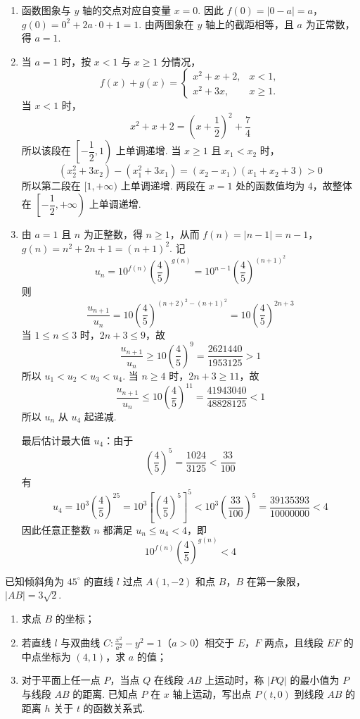 \begin{solution}
\begin{enumerate}
\item 函数图象与 \(y\) 轴的交点对应自变量 \(x=0\). 因此
\(f(0)=|0-a|=a\)，\(g(0)=0^2+2a\cdot0+1=1\).
由两图象在 \(y\) 轴上的截距相等，且 \(a\) 为正常数，得 \(a=1\).

\item 当 \(a=1\) 时，按 \(x<1\) 与 \(x\geqslant1\) 分情况，
\[
f(x)+g(x)=
\begin{cases}
x^2+x+2, & x<1,\\
x^2+3x, & x\geqslant1.
\end{cases}
\]
当 \(x<1\) 时，
\[
x^2+x+2=\left(x+\frac{1}{2}\right)^2+\frac{7}{4}
\]
所以该段在 \(\left[-\dfrac{1}{2},1\right)\) 上单调递增. 当 \(x\geqslant1\) 且 \(x_1<x_2\) 时，
\[
(x_2^2+3x_2)-(x_1^2+3x_1)=(x_2-x_1)(x_1+x_2+3)>0
\]
所以第二段在 \([1,+\infty)\) 上单调递增. 两段在 \(x=1\) 处的函数值均为 \(4\)，故整体在 \(\left[-\dfrac{1}{2},+\infty\right)\) 上单调递增.

\item 由 \(a=1\) 且 \(n\) 为正整数，得 \(n\geqslant1\)，从而
\(f(n)=|n-1|=n-1\)，\(g(n)=n^2+2n+1=(n+1)^2\).
记
\[
u_n=10^{f(n)}\left(\frac45\right)^{g(n)}
=10^{n-1}\left(\frac45\right)^{(n+1)^2}
\]
则
\[
\frac{u_{n+1}}{u_n}=10\left(\frac45\right)^{(n+2)^2-(n+1)^2}=10\left(\frac45\right)^{2n+3}
\]
当 \(1\leqslant n\leqslant3\) 时，\(2n+3\leqslant9\)，故
\[
\frac{u_{n+1}}{u_n}\geqslant10\left(\frac45\right)^9
=\frac{2621440}{1953125}>1
\]
所以 \(u_1<u_2<u_3<u_4\). 当 \(n\geqslant4\) 时，\(2n+3\geqslant11\)，故
\[
\frac{u_{n+1}}{u_n}\leqslant10\left(\frac45\right)^{11}
=\frac{41943040}{48828125}<1
\]
所以 \(u_n\) 从 \(u_4\) 起递减.

最后估计最大值 \(u_4\)：由于
\[
\left(\frac45\right)^5=\frac{1024}{3125}<\frac{33}{100}
\]
有
\[
u_4=10^3\left(\frac45\right)^{25}
=10^3\left[\left(\frac45\right)^5\right]^5
<10^3\left(\frac{33}{100}\right)^5
=\frac{39135393}{10000000}<4
\]
因此任意正整数 \(n\) 都满足 \(u_n\leqslant u_4<4\)，即
\[
10^{f(n)}\left(\frac45\right)^{g(n)}<4
\]
\end{enumerate}
\end{solution}

\begin{problem}
已知倾斜角为 \(45^{\circ}\) 的直线 \(l\) 过点 \(A(1,-2)\) 和点 \(B\)，\(B\) 在第一象限，\(|AB|=3\sqrt{2}\).

\begin{enumerate}
\item 求点 \(B\) 的坐标；
\item 若直线 \(l\) 与双曲线 \(C:\frac{x^2}{a^2}-y^2=1\)（\(a>0\)）相交于 \(E\)，\(F\) 两点，且线段 \(EF\) 的中点坐标为 \((4,1)\)，求 \(a\) 的值；
\item 对于平面上任一点 \(P\)，当点 \(Q\) 在线段 \(AB\) 上运动时，称 \(|PQ|\) 的最小值为 \(P\) 与线段 \(AB\) 的距离. 已知点 \(P\) 在 \(x\) 轴上运动，写出点 \(P(t,0)\) 到线段 \(AB\) 的距离 \(h\) 关于 \(t\) 的函数关系式.
\end{enumerate}
\end{problem}

